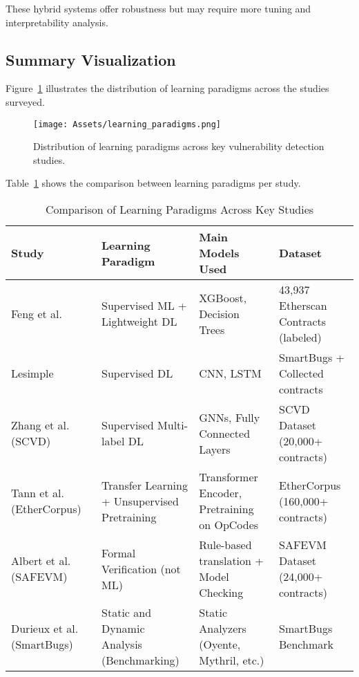 These hybrid systems offer robustness but may require more tuning and interpretability analysis.

\subsection*{Summary Visualization}

Figure~\ref{fig:learning_paradigm_distribution} illustrates the distribution of learning paradigms across the studies surveyed.

\begin{figure}[H]
    \centering
    \texttt{[image: Assets/learning\_paradigms.png]}
    \caption{Distribution of learning paradigms across key vulnerability detection studies.}
    \label{fig:learning_paradigm_distribution}
\end{figure}

Table~\ref{tab:learning_paradigms_comparison} shows the comparison between learning paradigms per study. 

\begin{table}[H]
\centering
\small
\renewcommand{\arraystretch}{1.3}

\begin{tabular}{|p{3.3cm}|p{3cm}|p{4.5cm}|p{2.5cm}|}
\hline
\textbf{Study} & \textbf{Learning Paradigm} & \textbf{Main Models Used} & \textbf{Dataset} \\
\hline

Feng et al.~\cite{feng2024interpretable} & Supervised ML + Lightweight DL & XGBoost, Decision Trees & 43,937 Etherscan Contracts (labeled) \\
\hline

Lesimple~\cite{lesimple2020master} & Supervised DL & CNN, LSTM & SmartBugs + Collected contracts \\
\hline

Zhang et al. (SCVD)~\cite{zhang2020scvd} & Supervised Multi-label DL & GNNs, Fully Connected Layers & SCVD Dataset (20,000+ contracts) \\
\hline

Tann et al. (EtherCorpus)~\cite{tann2020towards} & Transfer Learning + Unsupervised Pretraining & Transformer Encoder, Pretraining on OpCodes & EtherCorpus (160,000+ contracts) \\
\hline

Albert et al. (SAFEVM)~\cite{albert2019safevm} & Formal Verification (not ML) & Rule-based translation + Model Checking & SAFEVM Dataset (24,000+ contracts) \\
\hline

Durieux et al. (SmartBugs)~\cite{durieux2020empirical} & Static and Dynamic Analysis (Benchmarking) & Static Analyzers (Oyente, Mythril, etc.) & SmartBugs Benchmark \\
\hline

\end{tabular}
\caption{Comparison of Learning Paradigms Across Key Studies}
\label{tab:learning_paradigms_comparison}
\end{table}

